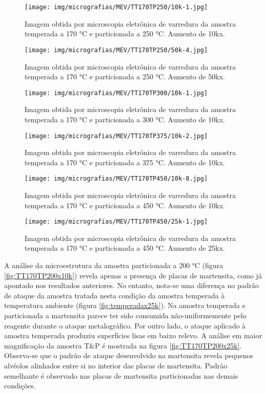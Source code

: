 \begin{figure}
	\texttt{[image: img/micrografias/MEV/TT170TP250/10k-1.jpg]}
	\caption{Imagem obtida por microscopia eletrônica de varredura da amostra temperada a 170 °C e particionada a 250 °C. Aumento de 10kx.}
	\label{fig:TT170TP250x10k}
\end{figure}

\begin{figure}
	\texttt{[image: img/micrografias/MEV/TT170TP250/50k-4.jpg]}
	\caption{Imagem obtida por microscopia eletrônica de varredura da amostra temperada a 170 °C e particionada a 250 °C. Aumento de 50kx.}
	\label{fig:TT170TP250x50k}
\end{figure}

\begin{figure}
	\texttt{[image: img/micrografias/MEV/TT170TP300/10k-1.jpg]}
	\caption{Imagem obtida por microscopia eletrônica de varredura da amostra temperada a 170 °C e particionada a 300 °C. Aumento de 10kx.}
	\label{fig:TT170TP300x10k}
\end{figure}

\begin{figure}
	\texttt{[image: img/micrografias/MEV/TT170TP375/10k-2.jpg]}
	\caption{Imagem obtida por microscopia eletrônica de varredura da amostra temperada a 170 °C e particionada a 375 °C. Aumento de 10kx.}
	\label{fig:TT170TP375x10k}
\end{figure}

\begin{figure}
	\texttt{[image: img/micrografias/MEV/TT170TP450/10k-8.jpg]}
	\caption{Imagem obtida por microscopia eletrônica de varredura da amostra temperada a 170 °C e particionada a 450 °C. Aumento de 10kx.}
	\label{fig:TT170TP450x10k}
\end{figure}

\begin{figure}
	\texttt{[image: img/micrografias/MEV/TT170TP450/25k-1.jpg]}
	\caption{Imagem obtida por microscopia eletrônica de varredura da amostra temperada a 170 °C e particionada a 450 °C. Aumento de 25kx.}
	\label{fig:TT170TP450x25k}
\end{figure}

A análise da microestrutura da amostra particionada a 200 °C (figura \ref{fig:TT170TP200x10k}) revela apenas a presença de placas de martensita, como já apontado nos resultados anteriores. No entanto, nota-se uma diferença no padrão de ataque da amostra tratada nesta condição da amostra temperada à temperatura ambiente (figura \ref{fig:temperadax25k}). Na amostra temperada e particionada a martensita parece ter sido consumida não-uniformemente pelo reagente durante o ataque metalográfico. Por outro lado, o ataque aplicado à amostra temperada produziu superfícies lisas em baixo relevo. A análise em maior magnificação da amostra T\&P é mostrada na figura \ref{fig:TT170TP200x25k}. Observa-se que o padrão de ataque desenvolvido na martensita revela pequenos alvéolos alinhados entre si no interior das placas de martensita. Padrão semelhante é observado nas placas de martensita particionadas nas demais condições.

